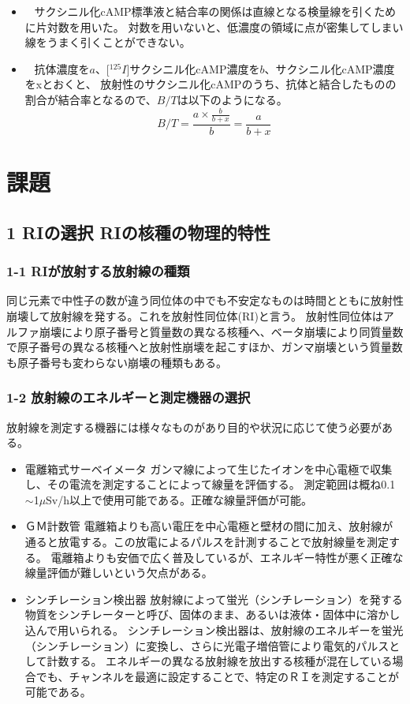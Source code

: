 \documentclass[a4paper,papersize,dvipdfmx]{jsarticle}
\newcommand{\mon}[1]{\item[({#1})] \ }
\begin{document}
\begin{itemize}
\mon{5}
サクシニル化cAMP標準液と結合率の関係は直線となる検量線を引くために片対数を用いた。
対数を用いないと、低濃度の領域に点が密集してしまい線をうまく引くことができない。

\mon{6}
抗体濃度を$a$、[$^{125}I$]サクシニル化cAMP濃度を$b$、サクシニル化cAMP濃度をxとおくと、
放射性のサクシニル化cAMPのうち、抗体と結合したものの割合が結合率となるので、$B/T$は以下のようになる。
\[
B/T = \frac{a \times \frac{b}{b+x}}{b} = \frac{a}{b+x}
\]

\end{itemize}

\section*{課題}
\subsection*{1 RIの選択 RIの核種の物理的特性}
\subsubsection*{1-1 RIが放射する放射線の種類}
同じ元素で中性子の数が違う同位体の中でも不安定なものは時間とともに放射性崩壊して放射線を発する。これを放射性同位体(RI)と言う。
放射性同位体はアルファ崩壊により原子番号と質量数の異なる核種へ、ベータ崩壊により同質量数で原子番号の異なる核種へと放射性崩壊を起こすほか、ガンマ崩壊という質量数も原子番号も変わらない崩壊の種類もある。
\subsubsection*{1-2 放射線のエネルギーと測定機器の選択}
放射線を測定する機器には様々なものがあり目的や状況に応じて使う必要がある。
\begin{itemize}
\item 電離箱式サーベイメータ
ガンマ線によって生じたイオンを中心電極で収集し、その電流を測定することによって線量を評価する。
測定範囲は概ね0.1$\sim$1$\mu$Sv/h以上で使用可能である。正確な線量評価が可能。
\item ＧＭ計数管
電離箱よりも高い電圧を中心電極と壁材の間に加え、放射線が通ると放電する。この放電によるパルスを計測することで放射線量を測定する。
電離箱よりも安価で広く普及しているが、エネルギー特性が悪く正確な線量評価が難しいという欠点がある。
\item シンチレーション検出器
放射線によって蛍光（シンチレーション）を発する物質をシンチレーターと呼び、固体のまま、あるいは液体・固体中に溶かし込んで用いられる。
シンチレーション検出器は、放射線のエネルギーを蛍光（シンチレーション）に変換し、さらに光電子増倍管により電気的パルスとして計数する。
エネルギーの異なる放射線を放出する核種が混在している場合でも、チャンネルを最適に設定することで、特定のＲＩを測定することが可能である。
\end{itemize}
\end{document}
